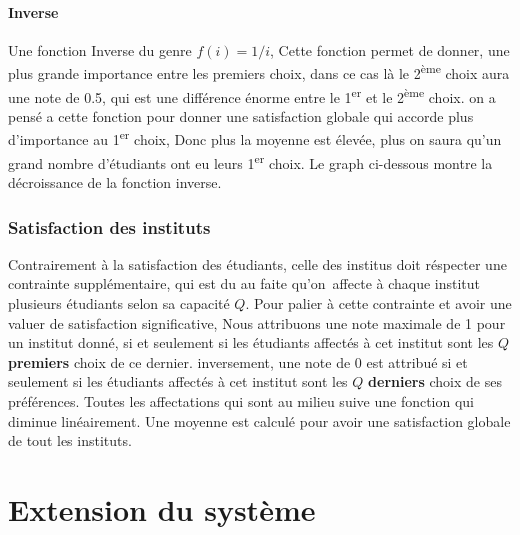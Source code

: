 \documentclass[12pt,titlepage]{article}
\begin{document}
\begin{figure}
  
\end{figure}

\paragraph{Inverse} Une fonction Inverse du genre $f(i) = 1/i$, Cette fonction permet de donner, une plus grande importance entre les premiers choix, dans ce cas là le 2\textsuperscript{ème} choix aura une note de 0.5, qui est une différence énorme entre le 1\textsuperscript{er} et le 2\textsuperscript{ème} choix. on a pensé a cette fonction pour donner une satisfaction globale qui accorde plus d'importance au 1\textsuperscript{er} choix, Donc plus la moyenne est élevée, plus on saura qu'un grand nombre d'étudiants ont eu leurs 1\textsuperscript{er} choix. Le graph ci-dessous montre la décroissance de la fonction inverse. 

\begin{figure}
  
\end{figure}



\subsubsection*{Satisfaction des instituts}
Contrairement à la satisfaction des étudiants, celle des institus doit réspecter une contrainte supplémentaire, qui est du au faite qu'on affecte à chaque institut plusieurs étudiants selon sa capacité $Q$. Pour palier à cette contrainte et avoir une valuer de satisfaction significative, Nous attribuons une note maximale de 1 pour un institut donné, si et seulement si les étudiants affectés à cet institut sont les $Q$ \textbf{premiers} choix de ce dernier. inversement, une note de 0 est attribué si et seulement si les étudiants affectés à cet institut sont les $Q$ \textbf{derniers} choix de ses préférences. Toutes les affectations qui sont au milieu suive une fonction qui diminue linéairement. Une moyenne est calculé pour avoir une satisfaction globale de tout les instituts.


\begin{figure}
  
\end{figure}





\section{Extension du système}
\end{document}
